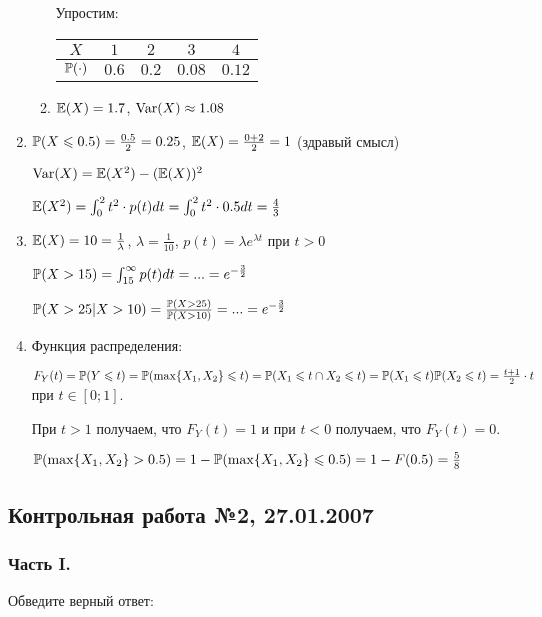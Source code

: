 \begin{enumerate}
\begin{enumerate}
Упростим:

\begin{tabular}{@{}ccccc@{}}
\toprule
$X$       & $1$   & $2$   & $3$    & $4$    \\ \midrule
$\P(\cdot)$ & $0.6$ & $0.2$ & $0.08$ & $0.12$ \\ \bottomrule
\end{tabular}
\item $\E(X)=1.7$, $\Var(X)\approx 1.08$
\end{enumerate}
\item  $\P(X\le 0.5)=\frac{0.5}{2}=0.25$, $\E(X)=\frac{0+2}{2}=1$ (здравый смысл)

$\Var(X)=\E(X^{2})-(\E(X))^{2}$

$\E(X^{2})=\int_{0}^{2}t^{2}\cdot p(t)dt=\int_{0}^{2}t^{2}\cdot 0.5dt=\frac{4}{3}$
\item $\E(X)=10=\frac{1}{\lambda}$, $\lambda=\frac{1}{10}$, $p(t)=\lambda e^{\lambda t}$ при $t>0$

$\P(X>15)=\int_{15}^{\infty}p(t)dt=...=e^{-\frac{3}{2}}$

$\P(X>25|X>10)=\frac{\P(X>25)}{\P(X>10)}=...=e^{-\frac{3}{2}}$
\item Функция распределения:

$F_{Y}(t)=\P(Y\le t)=\P(\max\{X_{1},X_{2}\}\le t)=\P(X_{1}\le t\cap X_{2}\le t)=\P(X_{1}\le t)\P(X_{2}\le t)=\frac{t+1}{2}\cdot t$ при $t\in [0;1]$.

При $t>1$ получаем, что $F_{Y}(t)=1$ и при $t<0$ получаем, что $F_{Y}(t)=0$.

$\P(\max\{X_{1},X_{2}\}>0.5)=1-\P(\max\{X_{1},X_{2}\}\le 0.5)=1-F(0.5)=\frac{5}{8}$
\end{enumerate}

\subsection{Контрольная работа №2, 27.01.2007}

\subsubsection*{Часть I.}

Обведите верный ответ:

